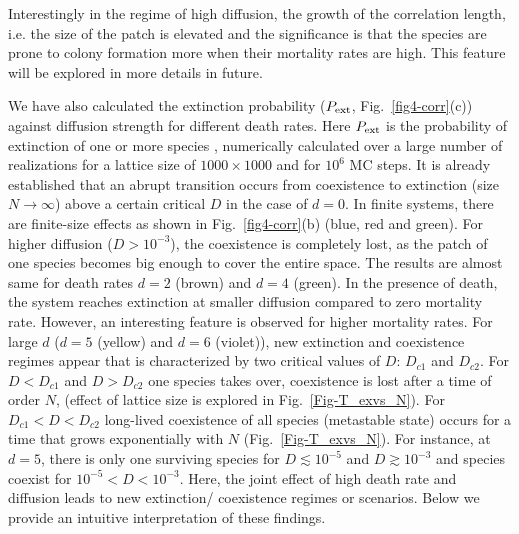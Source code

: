 \documentclass[aps, pre, twocolumn, amsmath, superscriptaddress,showkeys,showpacs]{revtex4-1}
\begin{document}
{{Interestingly in the regime of high diffusion, the growth of the correlation length, i.e. the size of the patch is elevated and the significance is that the species are prone to colony formation more when their mortality rates are high. This feature will be explored in more details in future. 
\par {
{ 	We have also calculated the extinction probability ($P_{\rm ext}$, Fig.\ \ref{fig4-corr}(c)) against diffusion strength for different death rates. { Here $P_{\rm ext}$ is the probability of extinction of one or more species \cite{reichenbach2007mobility}, numerically calculated over a large number of realizations for a lattice size of  $1000\times 1000$ and for $10^6$  MC steps. }  It is already established that \cite{reichenbach2007mobility}    an abrupt transition occurs from coexistence to extinction (size $N\rightarrow \infty$) above a certain critical $D$  in the case of  $d=0$. In finite systems, there are finite-size effects as shown in  Fig.\ \ref{fig4-corr}(b) (blue, red and green). }	
For higher diffusion ($D>10^{-3}$), the coexistence is completely lost, as the patch of one species becomes big enough to cover the entire space. The results are almost same for death rates $d=2$ (brown) and $d=4$ (green). In the presence of death, the system reaches extinction  %
{ at smaller diffusion} compared to zero mortality rate.
{ However, an interesting feature is observed for higher mortality rates. For large $d$ ($d=5$ (yellow) and $d=6$ (violet)),  new extinction and coexistence regimes appear that is characterized by two critical values of $D$:  $D_{c1}$ and $D_{c2}$.
For $D<D_{c1}$  and  $D>D_{c2}$ one species takes over, coexistence is lost after a time of { order $N$}, (effect of lattice size  is explored  in Fig.\ \ref{Fig-T_exvs_N}).
 For $D_{c1}<D<D_{c2}$  long-lived coexistence of all species (metastable state) occurs for a time that grows exponentially with $N$ (Fig.\ \ref{Fig-T_exvs_N}). For instance, at $d=5$, there is only one surviving species for $D \lesssim 10^{-5}$ and  $D \gtrsim 10^{-3}$ and species coexist for $10^{-5}<D<10^{-3}$. Here, the joint effect of high death rate and diffusion leads to new extinction/ coexistence regimes or scenarios.  Below we provide an intuitive interpretation of these findings.
}}}}
\end{document}
